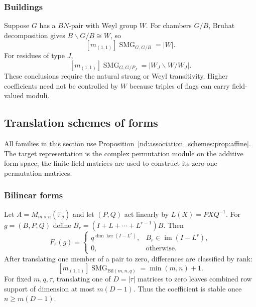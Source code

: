 \documentclass[10pt]{article}
\newcommand{\SMG}{\operatorname{SMG}}
\newcommand{\MGF}{\SMG}
\newcommand{\F}{\mathbb F}
\begin{document}
\subsubsection{Buildings}

Suppose $G$ has a $BN$-pair with Weyl group $W$.  For chambers $G/B$, Bruhat
decomposition gives $B\backslash G/B\cong W$, so
\begin{equation}\label{nd:association_schemes:eq:building-chamber}
 \boxed{[m_{(1,1)}]\MGF_{G,G/B}=|W|.}
\end{equation}
For residues of type $J$,
\begin{equation}\label{nd:association_schemes:eq:building-residue}
 \boxed{[m_{(1,1)}]\MGF_{G,G/P_J}=|W_J\backslash W/W_J|.}
\end{equation}
These conclusions require the natural strong or Weyl transitivity.  Higher
coefficients need not be controlled by $W$ because triples of flags can carry
field-valued moduli.

\subsection{Translation schemes of forms}

All families in this section use Proposition~\ref{nd:association_schemes:prop:affine}.  The target
representation is the complex permutation module on the additive form space;
the finite-field matrices are used to construct its zero-one permutation
matrices.

\subsubsection{Bilinear forms}

Let $A=M_{m\times n}(\F_q)$ and let $(P,Q)$ act linearly by
$L(X)=PXQ^{-1}$.  For $g=(B,P,Q)$ define
$B_r=(I+L+\cdots+L^{r-1})B$.  Then
\begin{equation}\label{nd:association_schemes:eq:bilinear-fixed}
 \boxed{F_r(g)=
 \begin{cases}
 q^{\dim\ker(I-L^r)},&B_r\in\operatorname{im}(I-L^r),\\
 0,&\text{otherwise}.
 \end{cases}}
\end{equation}
After translating one member of a pair to zero, differences are classified by
rank:
\begin{equation}\label{nd:association_schemes:eq:bilinear-pair}
 \boxed{[m_{(1,1)}]\MGF_{\mathrm{Bil}(m,n,q)}=\min(m,n)+1.}
\end{equation}
For fixed $m,q,\tau$, translating one of $D=|\tau|$ matrices to zero leaves
combined row support of dimension at most $m(D-1)$.  Thus the coefficient is
stable once $n\geq m(D-1)$.
\end{document}
